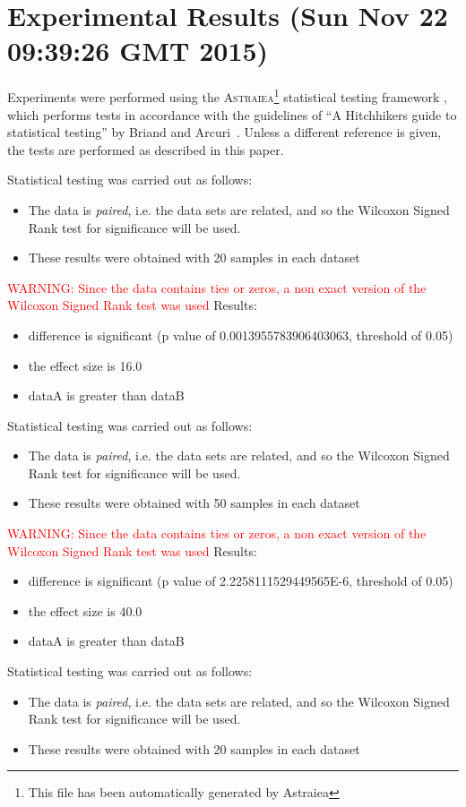 \documentclass[]{article}
\begin{document}
\section{Experimental Results (Sun Nov 22 09:39:26 GMT 2015)}
Experiments were performed using the \textsc{Astraiea}\footnote{This file has been automatically generated by Astraiea} statistical testing framework \cite{Neumann:2014:EET:2598394.2609850},
which performs tests in accordance with the guidelines of ``A Hitchhikers guide to statistical testing''
by Briand and Arcuri~\cite{Arcuri2012}.
Unless a different reference is given, the tests are performed as described in this paper.

Statistical testing was carried out as follows: \begin{itemize}
\item{The data is \textit{paired}, i.e. the data sets are related, and so the Wilcoxon Signed Rank test for significance will be used.}
\item{These results were obtained with 20 samples in each dataset}
\end{itemize}
\textcolor{Red}{WARNING: Since the data contains ties or zeros, a non exact version of the Wilcoxon Signed Rank test was used}
Results:
\begin{itemize}
\item{difference is significant (p value of 0.0013955783906403063, threshold of 0.05)}
\item{the effect size is 16.0}
\item{dataA is greater than dataB}
\end{itemize}Statistical testing was carried out as follows: \begin{itemize}
\item{The data is \textit{paired}, i.e. the data sets are related, and so the Wilcoxon Signed Rank test for significance will be used.}
\item{These results were obtained with 50 samples in each dataset}
\end{itemize}
\textcolor{Red}{WARNING: Since the data contains ties or zeros, a non exact version of the Wilcoxon Signed Rank test was used}
Results:
\begin{itemize}
\item{difference is significant (p value of 2.2258111529449565E-6, threshold of 0.05)}
\item{the effect size is 40.0}
\item{dataA is greater than dataB}
\end{itemize}Statistical testing was carried out as follows: \begin{itemize}
\item{The data is \textit{paired}, i.e. the data sets are related, and so the Wilcoxon Signed Rank test for significance will be used.}
\item{These results were obtained with 20 samples in each dataset}
\end{itemize}
\end{document}
